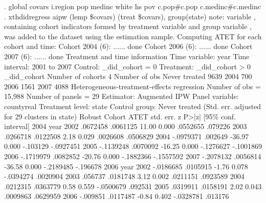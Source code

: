 . global covars i.region pop medinc white hs pov c.pop\#c.pop c.medinc\#c.medinc
{\smallskip}
. xthdidregress aipw (lemp \$covars) (treat \$covars), group(state)
note: variable {}, containing cohort indicators formed by treatment
      variable {} and group variable {}, was added to the dataset using
      the estimation sample.
{\smallskip}
Computing ATET for each cohort and time:
Cohort 2004 (6): ...... done
Cohort 2006 (6): ...... done
Cohort 2007 (6): ...... done
{\smallskip}
Treatment and time information
{\smallskip}
Time variable: year
Time interval: 2001 to 2007
Control:       _did_cohort = 0
Treatment:     _did_cohort > 0
                  {\VBAR} _did_cohort
Number of cohorts {\VBAR}           4
Number of obs     {\VBAR}
    Never treated {\VBAR}        9639
             2004 {\VBAR}         700
             2006 {\VBAR}        1561
             2007 {\VBAR}        4088
{\smallskip}
Heterogeneous-treatment-effects regression           Number of obs    = 15,988
                                                     Number of panels =     29
Estimator:       Augmented IPW
Panel variable:  countyreal
Treatment level: state
Control group:   Never treated
{\smallskip}
                                 (Std. err. adjusted for 29 clusters in state)
             {\VBAR}               Robust
Cohort       {\VBAR}       ATET   std. err.      z    P>|z|     [95\% conf. interval]
2004         {\VBAR}
        year {\VBAR}
       2002  {\VBAR}   .0672458   .0061125    11.00   0.000     .0552655     .079226
       2003  {\VBAR}   .0266718   .0122508     2.18   0.029     .0026608    .0506829
       2004  {\VBAR}  -.0979371    .002649   -36.97   0.000     -.103129   -.0927451
       2005  {\VBAR}  -.1139248   .0070092   -16.25   0.000    -.1276627   -.1001869
       2006  {\VBAR}  -.1719979   .0082852   -20.76   0.000    -.1882366   -.1557592
       2007  {\VBAR}  -.2078132   .0056814   -36.58   0.000    -.2189485    -.196678
2006         {\VBAR}
        year {\VBAR}
       2002  {\VBAR}  -.0186685   .0105915    -1.76   0.078    -.0394274    .0020904
       2003  {\VBAR}    .056737   .0181748     3.12   0.002     .0211151    .0923589
       2004  {\VBAR}   .0212315   .0363779     0.58   0.559    -.0500679     .092531
       2005  {\VBAR}   .0319911   .0158191     2.02   0.043     .0009863    .0629959
       2006  {\VBAR}   -.009851   .0117487    -0.84   0.402    -.0328781     .013176
